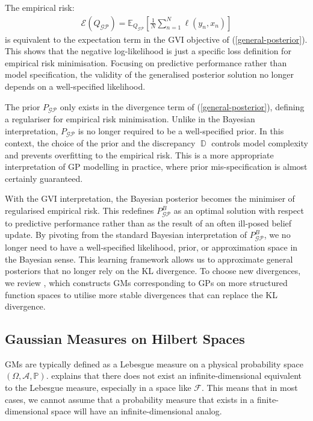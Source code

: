 \documentclass{article}
\newcommand{\D}{\operatorname{\mathbb{D}}}
\newcommand{\GP}{\operatorname{\mathcal{GP}}}
\numberwithin{equation}{section}
\begin{document}
The empirical risk:
\begin{align}
\mathcal{E}(Q_{\GP}) = \mathbb{E}_{Q_{\GP}}\left[\frac{1}{N}\sum_{n=1}^N \ell\left(y_n, x_n\right)\right]
\label{empirical-risk}
\end{align}
is equivalent to the expectation term in the GVI objective of (\ref{general-posterior}). This shows that the negative log-likelihood is just a specific loss definition for empirical risk minimisation. Focusing on predictive performance rather than model specification, the validity of the generalised posterior solution no longer depends on a well-specified likelihood.

The prior $P_{\GP}$ only exists in the divergence term of (\ref{general-posterior}), defining a regulariser for empirical risk minimisation. Unlike in the Bayesian interpretation, $P_{\GP}$ is no longer required to be a well-specified prior. In this context, the choice of the prior and the discrepancy $\D$ controls model complexity and prevents overfitting to the empirical risk. This is a more appropriate interpretation of GP modelling in practice, where prior mis-specification is almost certainly guaranteed.

With the GVI interpretation, the Bayesian posterior becomes the minimiser of regularised empirical risk. This redefines $P_{\GP}^B$ as an optimal solution with respect to predictive performance rather than as the result of an often ill-posed belief update. By pivoting from the standard Bayesian interpretation of $P_{\GP}^B$, we no longer need to have a well-specified likelihood, prior, or approximation space in the Bayesian sense. This learning framework allows us to approximate general posteriors that no longer rely on the KL divergence. To choose new divergences, we review \cite{wild2022generalized}, which constructs GMs corresponding to GPs on more structured function spaces to utilise more stable divergences that can replace the KL divergence.

\subsection{Gaussian Measures on Hilbert Spaces}
GMs are typically defined as a Lebesgue measure on a physical probability space $(\Omega, \mathcal{A}, \mathbb{P})$. \cite{matthews2017scalable} explains that there does not exist an infinite-dimensional equivalent to the Lebesgue measure, especially in a space like $\mathcal{F}$. This means that in most cases, we cannot assume that a  probability measure that exists in a finite-dimensional space will have an infinite-dimensional analog.
\end{document}
